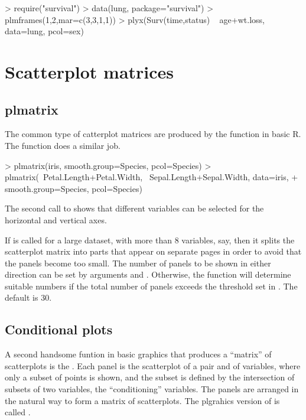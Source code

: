 \documentclass[11pt]{article}
\begin{document}
\begin{Schunk}
\begin{Sinput}
> require("survival")
> data(lung, package="survival")
> plmframes(1,2,mar=c(3,3,1,1))
> plyx(Surv(time,status) ~ age+wt.loss, data=lung, pcol=sex)
\end{Sinput}
\end{Schunk}


\section{Scatterplot matrices}
\subsection{plmatrix}
The common type of catterplot matrices are produced by the  function 
in basic R. The function  does a similar job.

\begin{Schunk}
\begin{Sinput}
> plmatrix(iris, smooth.group=Species, pcol=Species)
> plmatrix(~Petal.Length+Petal.Width, ~Sepal.Length+Sepal.Width, data=iris, 
+          smooth.group=Species, pcol=Species)
\end{Sinput}
\end{Schunk}

The second call to  shows that different variables can be
selected for the horizontal and vertical axes. 

If  is called for a large dataset, with more than 8 variables, 
say, then it splits the scatterplot matrix into parts that appear on
separate pages in order to avoid that the panels become too small.
The number of panels to be shown in either direction can be set by 
arguments  and . 
Otherwise, the function will determine suitable numbers 
if the total number of panels exceeds the threshold set in 
. The default is 30.

\subsection{Conditional plots}
A second handsome funtion in basic graphics that produces a ``matrix''
of scatterplots is the . 
Each panel is the scatterplot of a pair  and  of variables,
where only a subset of points is shown, and the subset is defined
by the intersection of subsets of two variables, the ``conditioning''
variables. The panels are arranged in the natural way to form
a matrix of scatterplots.
The plgrahics version of  is called .
\end{document}
